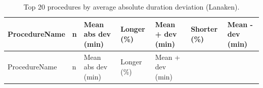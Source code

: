 \documentclass[
]{article}
\begin{document}
\begin{longtable}[]{@{}
  >{\centering\arraybackslash}p{}
  >{\centering\arraybackslash}p{}
  >{\centering\arraybackslash}p{}
  >{\centering\arraybackslash}p{}
  >{\centering\arraybackslash}p{}
  >{\centering\arraybackslash}p{}
  >{\centering\arraybackslash}p{}@{}}
\caption{Top 20 procedures by average absolute duration deviation
(Lanaken). \label{tab:duration_dev_proc}}\tabularnewline
\toprule\noalign{}
\begin{minipage}[b]{\linewidth}\centering
ProcedureName
\end{minipage} & \begin{minipage}[b]{\linewidth}\centering
n
\end{minipage} & \begin{minipage}[b]{\linewidth}\centering
Mean abs dev (min)
\end{minipage} & \begin{minipage}[b]{\linewidth}\centering
Longer (\%)
\end{minipage} & \begin{minipage}[b]{\linewidth}\centering
Mean + dev (min)
\end{minipage} & \begin{minipage}[b]{\linewidth}\centering
Shorter (\%)
\end{minipage} & \begin{minipage}[b]{\linewidth}\centering
Mean - dev (min)
\end{minipage} \\
\midrule\noalign{}
\endfirsthead
\toprule\noalign{}
\begin{minipage}[b]{\linewidth}\centering
ProcedureName
\end{minipage} & \begin{minipage}[b]{\linewidth}\centering
n
\end{minipage} & \begin{minipage}[b]{\linewidth}\centering
Mean abs dev (min)
\end{minipage} & \begin{minipage}[b]{\linewidth}\centering
Longer (\%)
\end{minipage} & \begin{minipage}[b]{\linewidth}\centering
Mean + dev (min)

\end{minipage}
\end{longtable}
\end{document}
